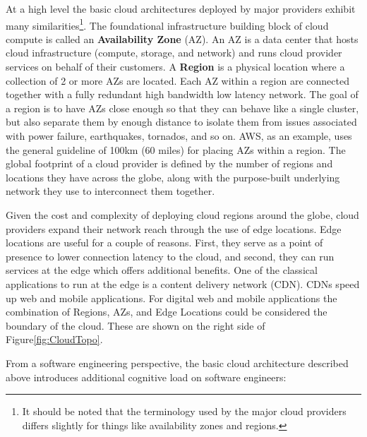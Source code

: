 \documentclass[conference]{IEEEconf}
\begin{document}
At a high level the basic cloud architectures deployed by major providers exhibit many similarities\footnote{It should be noted that the terminology used by the major cloud providers differs slightly for things like availability zones and regions.}.  The foundational infrastructure building block of cloud compute is called an \textbf{Availability Zone} (AZ).  An AZ is a data center that hosts cloud infrastructure (compute, storage, and network) and runs cloud provider services on behalf of their customers.  A \textbf{Region} is a physical location where a collection of 2 or more AZs are located.  Each AZ within a region are connected together with a fully redundant high bandwidth low latency network.  The goal of a region is to have AZs close enough so that they can behave like a single cluster, but also separate them by enough distance to isolate them from issues associated with power failure, earthquakes, tornados, and so on.  AWS, as an example, uses the general guideline of 100km (60 miles)\cite{AWS-AZ} for placing AZs within a region. The global footprint of a cloud provider is defined by the number of regions and locations they have across the globe, along with the purpose-built underlying network they use to interconnect them together. 

Given the cost and complexity of deploying cloud regions around the globe, cloud providers expand their network reach through the use of edge locations.  Edge locations are useful for a couple of reasons. First, they serve as a point of presence to lower connection latency to the cloud, and second, they can run services at the edge which offers additional benefits.  One of the classical applications to run at the edge is a content delivery network (CDN). CDNs speed up web and mobile applications. For digital web and mobile applications the combination of Regions, AZs, and Edge Locations could be considered the boundary of the cloud. These are shown on the right side of Figure\ref{fig:CloudTopo}.      

From a software engineering perspective, the basic cloud architecture described above introduces additional cognitive load on software engineers:
\end{document}
